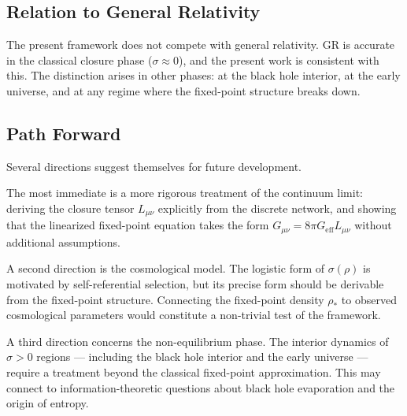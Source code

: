 \subsection{Relation to General Relativity}

The present framework does not compete with general relativity.
GR is accurate in the classical closure phase ($\sigma \approx 0$),
and the present work is consistent with this.
The distinction arises in other phases:
at the black hole interior, at the early universe,
and at any regime where the fixed-point structure breaks down.

\subsection{Path Forward}

Several directions suggest themselves for future development.

The most immediate is a more rigorous treatment of the continuum limit:
deriving the closure tensor $L_{\mu\nu}$ explicitly from the discrete network,
and showing that the linearized fixed-point equation takes the form
$G_{\mu\nu} = 8\pi G_{\text{eff}} L_{\mu\nu}$ without additional assumptions.

A second direction is the cosmological model.
The logistic form of $\sigma(\rho)$ is motivated by self-referential selection,
but its precise form should be derivable from the fixed-point structure.
Connecting the fixed-point density $\rho_*$ to observed cosmological parameters
would constitute a non-trivial test of the framework.

A third direction concerns the non-equilibrium phase.
The interior dynamics of $\sigma > 0$ regions — including the black hole interior
and the early universe — require a treatment beyond the classical fixed-point
approximation. This may connect to information-theoretic questions about
black hole evaporation and the origin of entropy.
